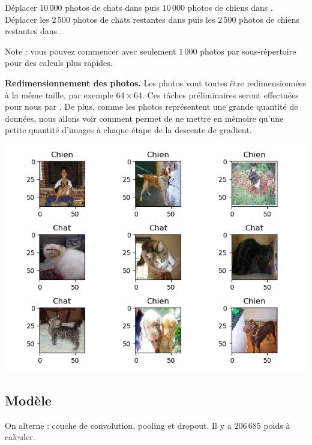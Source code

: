 \documentclass[11pt,class=report,crop=false]{standalone}
\begin{document}
Déplacer $10\,000$ photos de chats dans  
 puis $10\,000$ photos de chiens dans .
Déplacer les $2\,500$ photos de chats restantes  dans 
puis les $2\,500$ photos de chiens restantes dans .

Note : vous pouvez commencer avec seulement $1\,000$ photos par sous-répertoire pour des calculs plus rapides.

\textbf{Redimensionnement des photos.}
Les photos vont toutes être redimensionnées à la même taille, par exemple $64 \times 64$.
Ces tâches préliminaires seront effectuées pour nous par \keras.
De plus, comme les photos représentent une grande quantité de données, nous allons voir comment \keras{} permet de ne mettre en mémoire qu'une petite quantité d'images à chaque étape de la descente de gradient.


\begin{center}
\includegraphics[scale=\myscale,scale=0.8]{figures/tfconv-chienchat-train}
\end{center}


\subsection{Modèle}

On alterne : couche de convolution, pooling et dropout.
Il y a $206\,685$ poids à calculer.



\end{document}
